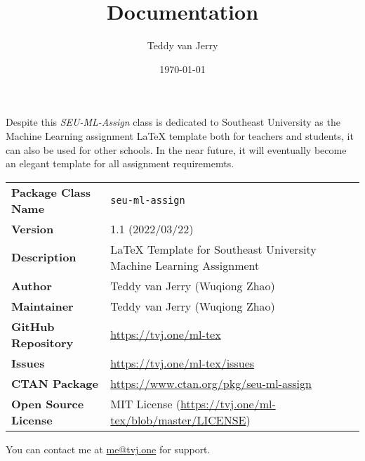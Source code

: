 \documentclass[twoside]{seu-ml-assign}
\title{Documentation}
\author{Teddy van Jerry}
\date{\today}
\newcommand{\grayrow}{\rowcolor[rgb]{ .906,  .902,  .902}}
\begin{document}
  \maketitle


    Despite this \textit{SEU-ML-Assign} class is dedicated to Southeast University as the Machine Learning assignment \LaTeX{} template both for teachers and students, it can also be used for other schools.
    In the near future, it will eventually become an elegant template for all assignment requirememts.

    \begin{table}[htbp]
      \bgroup
        \def\arraystretch{1.2}
        \setlength{\tabcolsep}{1.5em}
        \begin{tabular}{ll}
        \toprule
          \grayrow \textbf{Package Class Name} & \texttt{seu-ml-assign} \\
          \textbf{Version} & 1.1 (2022/03/22) \\
          \grayrow \textbf{Description} & \LaTeX{} Template for Southeast University Machine Learning Assignment \\
          \textbf{Author} & Teddy van Jerry (Wuqiong Zhao) \\
          \grayrow \textbf{Maintainer} & Teddy van Jerry (Wuqiong Zhao) \\
          \textbf{GitHub Repository} & \url{https://tvj.one/ml-tex} \\
          \grayrow \textbf{Issues} & \url{https://tvj.one/ml-tex/issues} \\
          \textbf{CTAN Package} & \url{https://www.ctan.org/pkg/seu-ml-assign} \\
          \grayrow\textbf{Open Source License} & MIT License (\url{https://tvj.one/ml-tex/blob/master/LICENSE}) \\
        \bottomrule
        \end{tabular}%
      \egroup
    \end{table}

    You can contact me at \href{mailto:me@tvj.one}{me@tvj.one} for support.

\end{document}

